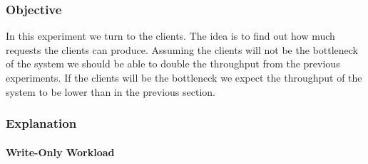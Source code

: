 \documentclass[11pt,a4paper]{article}
\begin{document}
\subsubsection{Objective}
%
In this experiment we turn to the clients.
%
The idea is to find out how much requests the clients can produce.
%
Assuming the clients will not be the bottleneck of the system we should be able to double the throughput from the previous experiments.
%
If the clients will be the bottleneck we expect the throughput of the system to be lower than in the previous section.
%
\subsubsection{Explanation}
%
\paragraph{Write-Only Workload}
%
\end{document}

